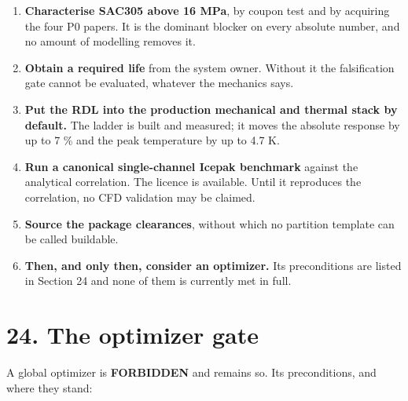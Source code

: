 \documentclass[10pt,]{article}
\providecommand{\tightlist}{%
  \setlength{\itemsep}{0pt}\setlength{\parskip}{0pt}}
\begin{document}
\begin{enumerate}
\def\labelenumi{\arabic{enumi}.}
\tightlist
\item
  \textbf{Characterise SAC305 above 16 MPa}, by coupon test and by
  acquiring the four P0 papers. It is the dominant blocker on every
  absolute number, and no amount of modelling removes it.
\item
  \textbf{Obtain a required life} from the system owner. Without it the
  falsification gate cannot be evaluated, whatever the mechanics says.
\item
  \textbf{Put the RDL into the production mechanical and thermal stack
  by default.} The ladder is built and measured; it moves the absolute
  response by up to 7 \% and the peak temperature by up to 4.7 K.
\item
  \textbf{Run a canonical single-channel Icepak benchmark} against the
  analytical correlation. The licence is available. Until it reproduces
  the correlation, no CFD validation may be claimed.
\item
  \textbf{Source the package clearances}, without which no partition
  template can be called buildable.
\item
  \textbf{Then, and only then, consider an optimizer.} Its preconditions
  are listed in Section 24 and none of them is currently met in full.
\end{enumerate}

\newpage

\hypertarget{the-optimizer-gate}{%
\section{24. The optimizer gate}\label{the-optimizer-gate}}

A global optimizer is \textbf{FORBIDDEN} and remains so. Its
preconditions, and where they stand:
\end{document}
